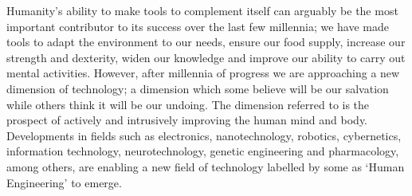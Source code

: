 

Humanity's ability to make tools to complement itself can arguably be the most important contributor to its success over the last few millennia; we have made tools to adapt the environment to our needs, ensure our food supply, increase our strength and dexterity, widen our knowledge and improve our ability to carry out mental activities. However, after millennia of progress we are approaching a new dimension of technology; a dimension which some believe will be our salvation while others think it will be our undoing. The dimension referred to is the prospect of actively and intrusively improving the human mind and body. Developments in fields such as electronics, nanotechnology, robotics, cybernetics, information technology, neurotechnology, genetic engineering and pharmacology, among others, are enabling a new field of technology labelled by some as ‘Human Engineering' to emerge.

